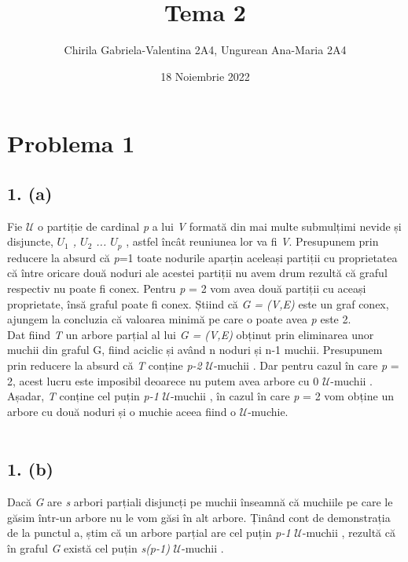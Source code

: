 \documentclass[12pt] {fphw}
\title{Tema 2}
\author{Chirila Gabriela-Valentina 2A4, Ungurean Ana-Maria 2A4 } %
\date{18 Noiembrie 2022} %
\institute{Universitatea Alexandru Ioan-Cuza \\ Facultatea de Informatică} %
\begin{document}
\maketitle 

\section*{Problema 1}
\subsection*{1. (a)} 
   Fie $\mathcal{U}$ o partiție de cardinal \textit{p} a lui \textit{V} formată din mai multe submulțimi nevide și disjuncte, \textit{  ${}U_{1}$ ,  ${}U_{2}$ ... ${}U_{p}$ }, astfel încât reuniunea lor va fi \textit{V}.  Presupunem prin reducere la absurd că \textit{p}=1 toate nodurile aparțin aceleași partiții cu proprietatea că între oricare două noduri ale acestei partiții  nu avem drum rezultă că graful respectiv nu poate fi conex. 
Pentru  \textit{p} = 2  vom avea două partiții cu aceași proprietate, însă graful poate fi conex. Știind că \textit{ G = (V,E)} este un graf conex, ajungem la concluzia că valoarea minimă pe care o poate avea  \textit{p} este 2. \\
  Dat fiind \textit{T} un arbore parțial al lui \textit{ G = (V,E)} obținut prin eliminarea unor muchii din graful G, fiind aciclic și având n noduri și n-1 muchii. Presupunem prin reducere la absurd că \textit{T} conține 
\textit{p-2} $\mathcal{U}$-muchii . Dar pentru cazul în care  \textit{p} = 2, acest lucru este imposibil deoarece nu putem avea arbore cu 0 $\mathcal{U}$-muchii . Așadar, \textit{T} conține cel puțin 
\textit{p-1}  $\mathcal{U}$-muchii , în cazul în care \textit{p} = 2 vom obține un arbore cu două noduri și o muchie aceea fiind o  $\mathcal{U}$-muchie. 
\\
\\

\subsection*{1. (b)} 
  Dacă \textit{G} are \textit{s} arbori parțiali disjuncți pe muchii înseamnă că muchiile pe care le găsim într-un arbore nu le vom găsi în alt arbore. Ținând cont de demonstrația de la punctul a, știm că un arbore parțial are cel puțin  \textit{p-1}  $\mathcal{U}$-muchii , rezultă că în graful  \textit{G} există cel puțin  \textit{s(p-1)} $\mathcal{U}$-muchii . 
\\
\\
\end{document}
